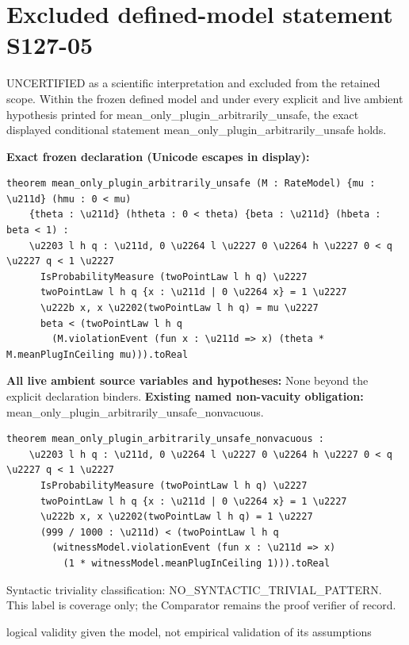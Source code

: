 \documentclass[11pt]{article}
\begin{document}
\section*{Excluded defined-model statement S127-05}
UNCERTIFIED as a scientific interpretation and excluded from the retained scope. Within the frozen defined model and under every explicit and live ambient hypothesis printed for mean\_\allowbreak{}only\_\allowbreak{}plugin\_\allowbreak{}arbitrarily\_\allowbreak{}unsafe, the exact displayed conditional statement mean\_\allowbreak{}only\_\allowbreak{}plugin\_\allowbreak{}arbitrarily\_\allowbreak{}unsafe holds.
\par\noindent\textbf{Exact frozen declaration (Unicode escapes in display):}
\begin{Verbatim}[breaklines=true,breakanywhere=true,fontsize=\scriptsize]
theorem mean_only_plugin_arbitrarily_unsafe (M : RateModel) {mu : \u211d} (hmu : 0 < mu)
    {theta : \u211d} (htheta : 0 < theta) {beta : \u211d} (hbeta : beta < 1) :
    \u2203 l h q : \u211d, 0 \u2264 l \u2227 0 \u2264 h \u2227 0 < q \u2227 q < 1 \u2227
      IsProbabilityMeasure (twoPointLaw l h q) \u2227
      twoPointLaw l h q {x : \u211d | 0 \u2264 x} = 1 \u2227
      \u222b x, x \u2202(twoPointLaw l h q) = mu \u2227
      beta < (twoPointLaw l h q
        (M.violationEvent (fun x : \u211d => x) (theta * M.meanPlugInCeiling mu))).toReal
\end{Verbatim}
\noindent\textbf{All live ambient source variables and hypotheses:}
None beyond the explicit declaration binders.
\noindent\textbf{Existing named non-vacuity obligation:} mean\_\allowbreak{}only\_\allowbreak{}plugin\_\allowbreak{}arbitrarily\_\allowbreak{}unsafe\_\allowbreak{}nonvacuous.
\begin{Verbatim}[breaklines=true,breakanywhere=true,fontsize=\scriptsize]
theorem mean_only_plugin_arbitrarily_unsafe_nonvacuous :
    \u2203 l h q : \u211d, 0 \u2264 l \u2227 0 \u2264 h \u2227 0 < q \u2227 q < 1 \u2227
      IsProbabilityMeasure (twoPointLaw l h q) \u2227
      twoPointLaw l h q {x : \u211d | 0 \u2264 x} = 1 \u2227
      \u222b x, x \u2202(twoPointLaw l h q) = 1 \u2227
      (999 / 1000 : \u211d) < (twoPointLaw l h q
        (witnessModel.violationEvent (fun x : \u211d => x)
          (1 * witnessModel.meanPlugInCeiling 1))).toReal
\end{Verbatim}
\noindent Syntactic triviality classification: NO\_\allowbreak{}SYNTACTIC\_\allowbreak{}TRIVIAL\_\allowbreak{}PATTERN. This label is coverage only; the Comparator remains the proof verifier of record.
\par\noindent logical validity given the model, not empirical validation of its assumptions
\end{document}
